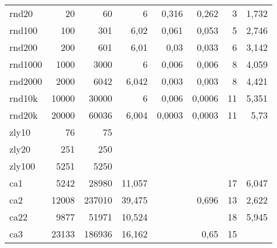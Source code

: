 \begin{landscape}
\begin{table}[h]
{\begin{tabular}{l|rrrrrrr}
		rnd20   & 20             & 60         & 6                & 0,316   & 0,262                              & 3       & 1,732                      \\
		rnd100  & 100            & 301        & 6,02             & 0,061   & 0,053                              & 5       & 2,746                      \\
		rnd200  & 200            & 601        & 6,01             & 0,03    & 0,033                              & 6       & 3,142                      \\
		rnd1000 & 1000           & 3000       & 6                & 0,006   & 0,006                              & 8       & 4,059                      \\
		rnd2000 & 2000           & 6042       & 6,042            & 0,003   & 0,003                              & 8       & 4,421                      \\
		rnd10k  & 10000          & 30000      & 6                & 0,006   & 0,0006                             & 11      & 5,351                      \\
		rnd20k  & 20000          & 60036      & 6,004            & 0,0003  & 0,0003                             & 11      & 5,73                       \\
		zly10   & 76             & 75         &                  &         &                                    &         &                            \\
		zly20   & 251            & 250        &                  &         &                                    &         &                            \\
		zly100  & 5251           & 5250       &                  &         &                                    &         &                            \\
		ca1     & 5242           & 28980      & 11,057           &         &                                    & 17      & 6,047                      \\
		ca2     & 12008          & 237010     & 39,475           &         & 0,696                              & 13      & 2,622                      \\
		ca22    & 9877           & 51971      & 10,524           &         &                                    & 18      & 5,945                      \\
		ca3     & 23133          & 186936     & 16,162           &         & 0,65                               & 15      &                            \\ \hline

\end{tabular}}
\end{table}
\end{landscape}
